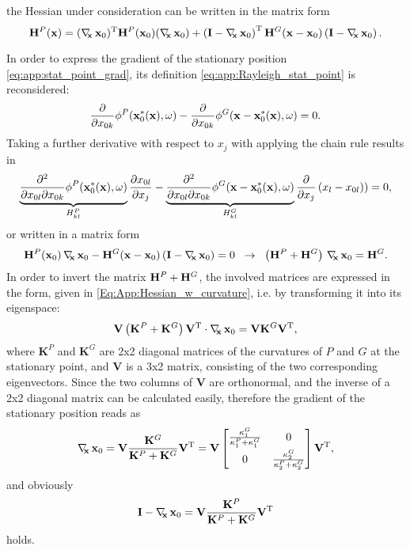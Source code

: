 the Hessian under consideration can be written in the matrix form
\begin{equation}
\label{eq:app:Hpij}
\mH^P(\vx) = (\Dx \vxo)^{\mathrm{T}}  \mH^P(\vxo) (\Dx \vxo) + \left( \mathbf{I} - \Dx \vxo \right)^{\mathrm{T}} \mH^G(\vx-\vxo) \left( \mathbf{I} - \Dx \vxo \right).
\end{equation}

In order to express the gradient of the stationary position \eqref{eq:app:stat_point_grad}, its definition \eqref{eq:app:Rayleigh_stat_point} is reconsidered:
\begin{equation}
\frac{\partial}{\partial x_{0 k}} \phi^P(\mathbf{x}_0^*(\mathbf{x}),\omega) - \frac{\partial}{\partial x_{0 k}}\phi^G(\mathbf{x}-\mathbf{x}_0^*(\mathbf{x}),\omega)  = 0.
\end{equation}
Taking a further derivative with respect to $x_j$ with applying the chain rule results in
\begin{equation}
\underbrace{\frac{\partial^2}{\partial x_{0 l} \partial x_{0 k}} \phi^P(\mathbf{x}_0^*(\mathbf{x}),\omega)}_{H^P_{kl}} \frac{\partial x_{0 l}}{\partial x_j}
- \underbrace{\frac{\partial^2}{\partial x_{0 l} \partial x_{0 k}} \phi^G(\mathbf{x}-\mathbf{x}_0^*(\mathbf{x}),\omega)}_{H^G_{kl} }  \frac{\partial}{\partial x_j} \left( x_l - x_{0 l} ) \right) = 0,
\end{equation}
or written in a matrix form
\begin{equation}
\mathbf{H}^P(\mathbf{x}_0) \, \nabla_{\!\!\mathbf{x}}\, \mathbf{x}_0 - \mathbf{H}^G(\mathbf{x}-\mathbf{x}_0) \left( \mathbf{I} - \nabla_{\!\!\mathbf{x}}\, \mathbf{x}_0 \right) = 0 \hspace{2mm} \rightarrow \hspace{2mm} \left( \mathbf{H}^P +  \mathbf{H}^G \right) \, \nabla_{\!\!\mathbf{x}}\, \mathbf{x}_0 = \mathbf{H}^G. 
\end{equation}
In order to invert the matrix $\mathbf{H}^P +  \mathbf{H}^G$, the involved matrices are expressed in the form, given in \eqref{Eq:App:Hessian_w_curvature}, i.e. by transforming it into its eigenspace:
\begin{equation}
 \mathbf{V} \left( \mathbf{K}^P + \mathbf{K}^G \right) \mathbf{V}^{\mathrm{T}} \cdot \nabla_{\!\!\mathbf{x}}\, \mathbf{x}_0 =   \mathbf{V} \mathbf{K}^G \mathbf{V}^{\mathrm{T}},
\end{equation}
where $\mathbf{K}^P$ and $\mathbf{K}^G$ are 2x2 diagonal matrices of the curvatures of $P$ and $G$ at the stationary point, and $\mathbf{V}$ is a 3x2 matrix, consisting of the two corresponding eigenvectors.
Since the two columns of $\mathbf{V}$ are orthonormal, and the inverse of a 2x2 diagonal matrix can be calculated easily, therefore the gradient of the stationary position reads as
\begin{equation}
\nabla_{\!\!\mathbf{x}}\, \mathbf{x}_0 =  \mathbf{V} \frac{\mathbf{K}^G}{\mathbf{K}^P + \mathbf{K}^G} \mathbf{V}^{\mathrm{T}} = 
\mathbf{V} 
\begin{bmatrix}
\frac{\kappa_1^G}{\kappa_1^P + \kappa_1^G} & 0 \\[.5em]
0 & \frac{\kappa_2^G}{\kappa_2^P + \kappa_2^G}
\\[0.3em]    \end{bmatrix}
\mathbf{V}^{\mathrm{T}},
\end{equation}
and obviously
\begin{equation}
\mathbf{I} - \nabla_{\!\!\mathbf{x}}\, \mathbf{x}_0 =  \mathbf{V} \frac{\mathbf{K}^P}{\mathbf{K}^P + \mathbf{K}^G} \mathbf{V}^{\mathrm{T}}
\end{equation}
holds.
	
